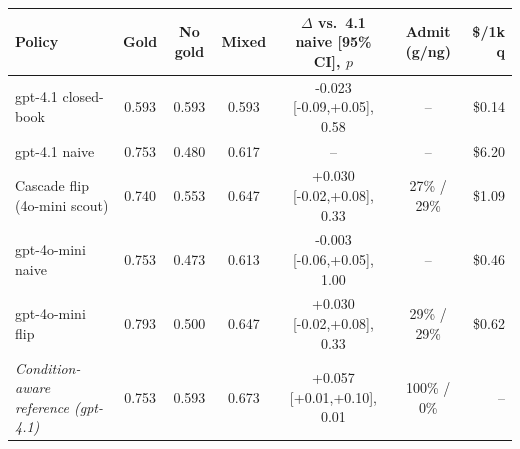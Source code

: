 \begin{tabular}{lcccccr}
\toprule
Policy & Gold & No gold & Mixed & $\Delta$ vs.\ 4.1 naive [95\% CI], $p$ & Admit (g/ng) & \$/1k q \\
\midrule
gpt-4.1 closed-book & 0.593 & 0.593 & 0.593 & -0.023 [-0.09,+0.05], 0.58 & -- & \$0.14 \\
gpt-4.1 naive & 0.753 & 0.480 & 0.617 & -- & -- & \$6.20 \\
Cascade flip (4o-mini scout) & 0.740 & 0.553 & 0.647 & +0.030 [-0.02,+0.08], 0.33 & 27\% / 29\% & \$1.09 \\
gpt-4o-mini naive & 0.753 & 0.473 & 0.613 & -0.003 [-0.06,+0.05], 1.00 & -- & \$0.46 \\
gpt-4o-mini flip & 0.793 & 0.500 & 0.647 & +0.030 [-0.02,+0.08], 0.33 & 29\% / 29\% & \$0.62 \\
\midrule
\textit{Condition-aware reference (gpt-4.1)} & 0.753 & 0.593 & 0.673 & +0.057 [+0.01,+0.10], 0.01 & 100\% / 0\% & -- \\
\bottomrule
\end{tabular}
